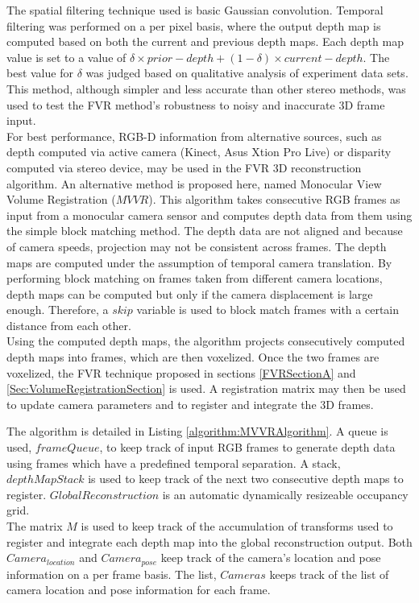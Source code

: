The spatial filtering technique used is basic Gaussian convolution. Temporal filtering was performed on a per pixel basis, where the output depth map is computed based on both the current and previous depth maps. Each depth map value is set to a value of $\delta \times prior-depth + (1-\delta) \times current-depth$. The best value for $\delta$ was judged based on qualitative analysis of experiment data sets. This method, although simpler and less accurate than other stereo methods, was used to test the FVR method's robustness to noisy and inaccurate 3D frame input. \\


For best performance, RGB-D information from alternative sources, such as depth computed via active camera (Kinect, Asus Xtion Pro Live) or disparity computed via stereo device, may be used in the FVR 3D reconstruction algorithm. An alternative method is proposed here, named Monocular View Volume Registration ($MVVR$). This algorithm takes consecutive RGB frames as input from a monocular camera sensor and computes depth data from them using the simple block matching method. The depth data are not aligned and because of camera speeds, projection may not be consistent across frames. The depth maps are computed under the assumption of temporal camera translation. By performing block matching on frames taken from different camera locations, depth maps can be computed but only if the camera displacement is large enough. Therefore, a $skip$ variable is used to block match frames with a certain distance from each other. \\

Using the computed depth maps, the algorithm projects consecutively computed depth maps into frames, which are then voxelized. Once the two frames are voxelized, the FVR technique proposed in sections \ref{FVRSectionA} and \ref{Sec:VolumeRegistrationSection} is used. A registration matrix may then be used to update camera parameters and to register and integrate the 3D frames. 

The algorithm is detailed in Listing \ref{algorithm:MVVRAlgorithm}. A queue is used, $frameQueue$, to keep track of input RGB frames to generate depth data using frames which have a predefined temporal separation. A stack, $depthMapStack$ is used to keep track of the next two consecutive depth maps to register. $GlobalReconstruction$ is an automatic dynamically resizeable occupancy grid. \\

The matrix $M$ is used to keep track of the accumulation of transforms used to register and integrate each depth map into the global reconstruction output. Both $Camera_{location}$ and $Camera_{pose}$ keep track of the camera's location and pose information on a per frame basis. The list, $Cameras$ keeps track of the list of camera location and pose information for each frame.\\

